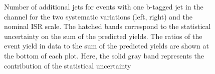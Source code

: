 \begin{figure}[htbp!]
\begin{center}
\caption{Number of additional jets for events with one b-tagged jet in the \emu channel for the two systematic variations (left, right) and the nominal ISR scale.
The hatched bands correspond to the statistical uncertainty on the sum of the predicted yields. 
        The ratios of the event yield in data to the sum of the predicted yields are
        shown at the bottom of each plot. Here, the solid gray band
        represents the contribution of the statistical uncertainty
  \label{fig:control_var_TT_ISRSCALE}}
  \end{center}
\end{figure}

\begin{figure}[htbp!]
  \begin{center}

\end{center}
\end{figure}
